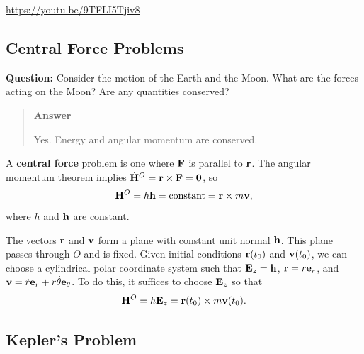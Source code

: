 \documentclass[
  letterpaper,
  DIV=11,
  numbers=noendperiod]{scrreprt}
\begin{document}
\url{https://youtu.be/9TFLI5Tjiv8}

\subsection{Central Force Problems}\label{central-force-problems}

\begin{tcolorbox}[enhanced jigsaw, arc=.35mm, bottomrule=.15mm, bottomtitle=1mm, breakable, colback=white, colbacktitle=quarto-callout-warning-color!10!white, colframe=quarto-callout-warning-color-frame, coltitle=black, left=2mm, leftrule=.75mm, opacityback=0, opacitybacktitle=0.6, rightrule=.15mm, title=\textcolor{quarto-callout-warning-color}{\faExclamationTriangle}\hspace{0.5em}{Example}, titlerule=0mm, toprule=.15mm, toptitle=1mm]

\textbf{Question:} Consider the motion of the Earth and the Moon. What
are the forces acting on the Moon? Are any quantities conserved?

\begin{quote}
\textbf{Answer}

Yes. Energy and angular momentum are conserved.
\end{quote}

\end{tcolorbox}

A \textbf{central force} problem is one where \({\bf F}\) is parallel to
\({\bf r}\). The angular momentum theorem implies
\(\dot{\bf H}^O = {\bf r}\times{\bf F} = {\bf 0}\), so \begin{align}
    {\bf H}^O = h{\bf h} = \text{constant} = {\bf r}\times m{\bf v},
\end{align} where \(h\) and \({\bf h}\) are constant.

The vectors \({\bf r}\) and \({\bf v}\) form a plane with constant unit
normal \({\bf h}\). This plane passes through \(O\) and is fixed. Given
initial conditions \({\bf r}(t_0)\) and \({\bf v}(t_0)\), we can choose
a cylindrical polar coordinate system such that \({\bf E}_z = {\bf h}\),
\({\bf r} = r{\bf e}_r\), and
\({\bf v} = \dot{r}{\bf e}_r+r\dot{\theta}{\bf e}_\theta\). To do this,
it suffices to choose \({\bf E}_z\) so that \begin{align}
    {\bf H}^O = h{\bf E}_z = {\bf r}(t_0)\times m{\bf v}(t_0).
\end{align}

\subsection{Kepler's Problem}\label{keplers-problem}
\end{document}
